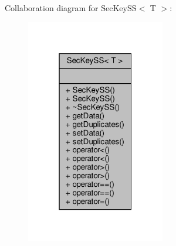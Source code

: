 Collaboration diagram for Sec\+Key\+SS$<$ T $>$\+:\nopagebreak
\begin{figure}[H]
\begin{center}
\leavevmode
\includegraphics[width=172pt]{classSecKeySS__coll__graph}
\end{center}
\end{figure}
